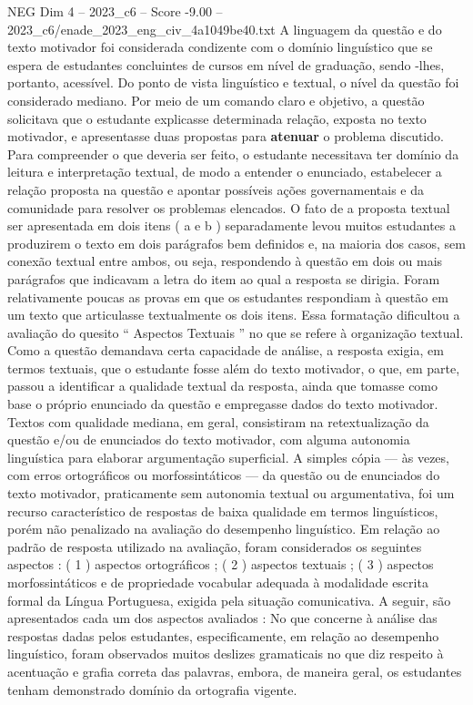 \begin{textsample}{NEG Dim 4 – 2023\_c6 – Score -9.00 – 2023\_c6/enade\_2023\_eng\_civ\_4a1049be40.txt}
A linguagem da questão e do texto motivador foi considerada condizente com o domínio linguístico que se espera de estudantes concluintes de cursos em nível de graduação, sendo -lhes, portanto, acessível.
Do ponto de vista linguístico e textual, o nível da questão foi considerado mediano.
Por meio de um comando claro e objetivo, a questão solicitava que o estudante explicasse determinada relação, exposta no texto motivador, e apresentasse duas propostas para \textbf{atenuar} o problema discutido.
Para compreender o que deveria ser feito, o estudante necessitava ter domínio da leitura e interpretação textual, de modo a entender o enunciado, estabelecer a relação proposta na questão e apontar possíveis ações governamentais e da comunidade para resolver os problemas elencados.
O fato de a proposta textual ser apresentada em dois itens ( a e b ) separadamente levou muitos estudantes a produzirem o texto em dois parágrafos bem definidos e, na maioria dos casos, sem conexão textual entre ambos, ou seja, respondendo à questão em dois ou mais parágrafos que indicavam a letra do item ao qual a resposta se dirigia.
Foram relativamente poucas as provas em que os estudantes respondiam à questão em um texto que articulasse textualmente os dois itens.
Essa formatação dificultou a avaliação do quesito “ Aspectos Textuais ” no que se refere à organização textual.
Como a questão demandava certa capacidade de análise, a resposta exigia, em termos textuais, que o estudante fosse além do texto motivador, o que, em parte, passou a identificar a qualidade textual da resposta, ainda que tomasse como base o próprio enunciado da questão e empregasse dados do texto motivador.
Textos com qualidade mediana, em geral, consistiram na retextualização da questão e/ou de enunciados do texto motivador, com alguma autonomia linguística para elaborar argumentação superficial.
A simples cópia — às vezes, com erros ortográficos ou morfossintáticos — da questão ou de enunciados do texto motivador, praticamente sem autonomia textual ou argumentativa, foi um recurso característico de respostas de baixa qualidade em termos linguísticos, porém não penalizado na avaliação do desempenho linguístico.
Em relação ao padrão de resposta utilizado na avaliação, foram considerados os seguintes aspectos : ( 1 ) aspectos ortográficos ; ( 2 ) aspectos textuais ; ( 3 ) aspectos morfossintáticos e de propriedade vocabular adequada à modalidade escrita formal da Língua Portuguesa, exigida pela situação comunicativa.
A seguir, são apresentados cada um dos aspectos avaliados : No que concerne à análise das respostas dadas pelos estudantes, especificamente, em relação ao desempenho linguístico, foram observados muitos deslizes gramaticais no que diz respeito à acentuação e grafia correta das palavras, embora, de maneira geral, os estudantes tenham demonstrado domínio da ortografia vigente.

\end{textsample}
